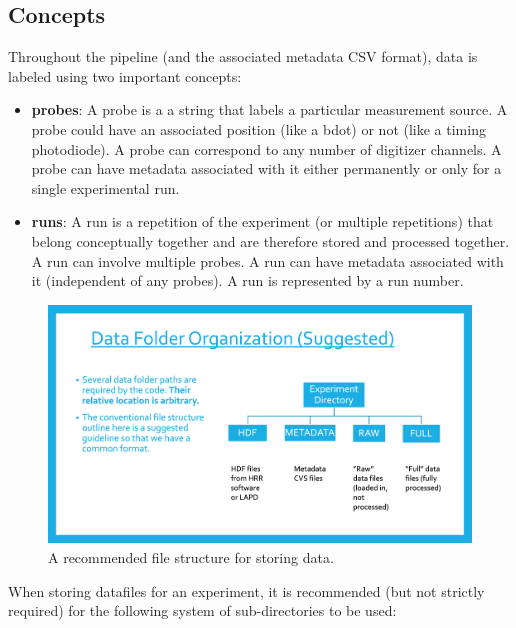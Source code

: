 \documentclass[12pt]{article}
\begin{document}
\subsection{Concepts}

Throughout the pipeline (and the associated metadata CSV format), data is labeled using two important concepts:

\begin{itemize}
\item \textbf{probes}: A probe is a a string that labels a particular measurement source. A probe could have an associated position (like a bdot) or not (like a timing photodiode). A probe can correspond to any number of digitizer channels. A probe can have metadata associated with it either permanently or only for a single experimental run. 

\item \textbf{runs}: A run is a repetition of the experiment (or multiple repetitions) that belong conceptually together and are therefore stored and processed together. A run can involve multiple probes. A run can have metadata associated with it (independent of any probes). A run is represented by a run number.
\end{itemize}

\begin{figure}[h]
\centering
\includegraphics[width=\textwidth]{file_struct}
\caption[File Structure]
{\label{file_struct} A recommended file structure for storing data.}
\end{figure}

When storing datafiles for an experiment, it is recommended (but not strictly required) for the following system of sub-directories to be used:
\end{document}
